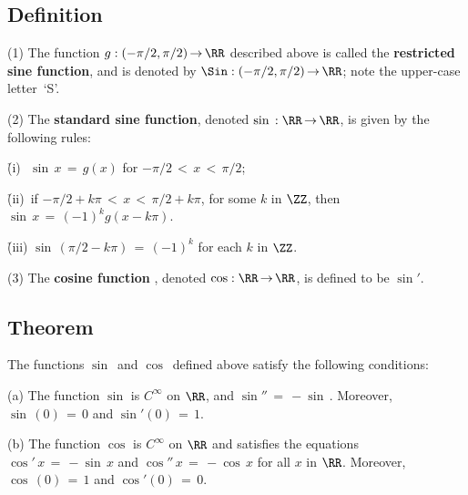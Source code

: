 \V

             \subsection{\small{\bf Definition}}
            \label{DefE45.128B}

\V

\hspace*{\parindent}(1) The function $g:(-{\pi}/2, {\pi}/2) \,{\rightarrow}\, {\RR}$
    described above is called the {\bf restricted sine function},
    and is denoted by ${\Sin}:(-{\pi}/2,{\pi}/2) \,{\rightarrow}\, {\RR}$; note the upper-case letter~`S'.

\V

        (2) The {\bf standard sine function}, denoted ${\sin}\,:{\RR} \,{\rightarrow}\, {\RR}$, is given by the following rules:

       \h (i)\,\, ${\sin}\,x \,=\, g(x)$ for $-{\pi}/2\,<\,x\,<\,{\pi}/2$;

       \h (ii)\, if $-{\pi}/2 + k{\pi}\,<\,x\,<\,{\pi}/2 + k{\pi}$, for some $k$ in ${\ZZ}$,
    then ${\sin}\,x \,=\, (-1)^{k}g(x-k{\pi})$.

       \h (iii) ${\sin}\,\left({\pi}/2 - k{\pi}\right) \,=\, (-1)^{k}$ for each $k$ in ${\ZZ}$.

\V

        (3) The {\bf cosine function },
    denoted ${\cos}:{\RR} \,{\rightarrow}\, {\RR}$, is defined to be ${\sin}'$.

\V

             \subsection{\small{\bf Theorem}}
            \label{ThmE45.128C}

\V

        The functions ${\sin}\,$ and ${\cos}\,$ defined above satisfy the following conditions:

\V

        (a) The function ${\sin}$ is $C^{{\infty}}$ on ${\RR}$, and ${\sin}'' \,=\, -{\sin}\,$. Moreover, ${\sin}\,(0) \,=\, 0$ and ${\sin}'(0) \,=\, 1$.

\V

        (b) The function ${\cos}$ is $C^{{\infty}}$ on ${\RR}$ and satisfies the equations ${\cos}'\,x \,=\, -{\sin}\,x$ and ${\cos}''\,x \,=\, -{\cos}\,x$ for all $x$ in ${\RR}$.
    Moreover, ${\cos}\,(0) \,=\, 1$ and ${\cos}'(0) \,=\, 0$.

